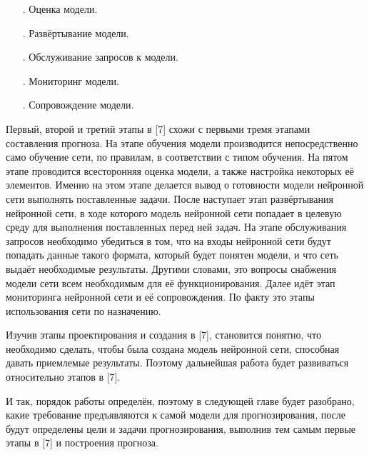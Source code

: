 {\begin{itemize}[leftmargin=2.15cm, labelwidth=0.65cm, labelsep=0.0cm]
		\item[\theitemcntr. ] Оценка модели.
		\addtocounter{itemcntr}{1}
		
		\item[\theitemcntr. ] Развёртывание модели.
		\addtocounter{itemcntr}{1}
		
		\item[\theitemcntr. ] Обслуживание запросов к модели.
		\addtocounter{itemcntr}{1}
		
		\item[\theitemcntr. ] Мониторинг модели.
		\addtocounter{itemcntr}{1}
		
		\item[\theitemcntr. ] Сопровождение модели. 
		\addtocounter{itemcntr}{1}
		
		\setcounter{itemcntr}{1}
	\end{itemize} 
	
	\par \redline Первый, второй и третий этапы в [7] схожи с первыми тремя этапами составления прогноза. На этапе обучения модели производится непосредственно само обучение сети, по правилам, в соответствии с типом обучения. На пятом этапе проводится всесторонняя оценка модели, а также настройка некоторых её элементов. Именно на этом этапе делается вывод о готовности модели нейронной сети выполнять поставленные задачи. После наступает этап развёртывания нейронной сети, в ходе которого модель нейронной сети попадает в целевую среду для выполнения поставленных перед ней задач. На этапе обслуживания запросов необходимо убедиться в том, что на входы нейронной сети будут попадать данные такого формата, который будет понятен модели, и что сеть выдаёт необходимые результаты. Другими словами, это вопросы снабжения модели сети всем необходимым для её функционирования. Далее идёт этап мониторинга нейронной сети и её сопровождения. По факту это этапы использования сети по назначению.    
	
	\par \redline Изучив этапы проектирования и создания в [7], становится понятно, что необходимо сделать, чтобы была создана модель нейронной сети, способная давать приемлемые результаты. Поэтому дальнейшая работа будет развиваться относительно этапов в [7].
	
	\par \redline И так, порядок работы определён, поэтому в следующей главе будет разобрано, какие требование предъявляются к самой модели для прогнозирования, после будут определены цели и задачи прогнозирования, выполнив тем самым первые этапы в [7] и построения прогноза.
	
	\par
}


